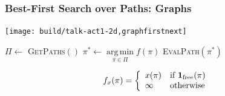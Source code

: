 \documentclass[serif]{beamer}
\DeclareMathOperator*{\argmin}{arg\,min}
\begin{document}
\begin{frame}
   \frametitle{Best-First Search over Paths: Graphs}
   \begin{center}
      \texttt{[image: build/talk-act1-2d,graphfirstnext]}
      
      \begin{minipage}{0.65\textwidth}
      \begin{algorithmic}
      \Loop
         \State $\Pi \leftarrow $ \textsc{GetPaths}$()$
            \Comment {}
         \State $\pi^* \leftarrow \argmin\limits_{\pi \in \Pi} f(\pi)$
            \Comment {}
         \State \textsc{EvalPath}$(\pi^*)$
            \Comment {}
      \EndLoop
      \end{algorithmic}
      \end{minipage}
      
      \begin{equation*}
         f_x(\pi) =
         \left\{ \begin{array}{ll}
             x(\pi) & \mbox{if } {\bf 1}_{\mbox{\scriptsize free}}(\pi) \\
             \infty & \mbox{otherwise}
         \end{array} \right.
      \end{equation*}
      
   \end{center}
\end{frame}
\end{document}
